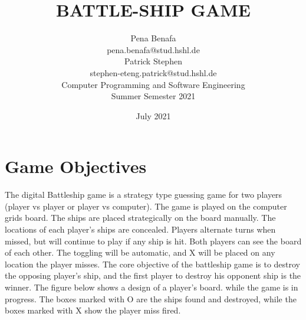 \documentclass[12pt]{article}
\title{%
  \Huge BATTLE-SHIP GAME}
\author{Pena Benafa\\pena.benafa@stud.hshl.de\\Patrick Stephen\\stephen-eteng.patrick@stud.hshl.de\\
  \large Computer Programming and Software Engineering\\
  \large Summer Semester 2021}
\date{July 2021}
\begin{document}
\maketitle
\begin{figure}[htbp]

\label{fig}
\end{figure}

\newpage
\tableofcontents
\newpage

\section{Game Objectives}
The digital Battleship game is a strategy type guessing game for two players (player vs player or player vs computer). The game is played on the computer grids board. The ships are placed strategically on the board manually. The locations of each player's ships are concealed. Players alternate turns when missed, but will continue to play if any ship is hit. Both players can see the board of each other. The toggling will be automatic, and X will be placed on any location the player misses. The core objective of the battleship game is to destroy the opposing player's ship, and the first player to destroy his opponent ship is the winner.\cite{a1} 
The figure below shows a design of a player's board. while the game is in progress. The boxes marked with O are the ships found and destroyed, while the boxes marked with X show the player miss fired.
\end{document}
